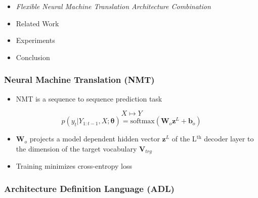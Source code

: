 \begin{frame}

\begin{itemize}
    \item \emph{\color{UOYellow}Flexible Neural Machine Translation Architecture
        Combination}
    \item Related Work
    \item Experiments
    \item Conclusion
\end{itemize}

\end{frame}

\begin{frame}
\frametitle{Neural Machine Translation (NMT)}

\begin{itemize} 
    \item NMT is a sequence to sequence prediction task 
\end{itemize}
\[
    X \mapsto Y
\]
\[
    p(y_t | Y_{1:t-1}, X; \boldsymbol{\theta}) = \text{softmax}(\boldsymbol{W}_o
            \boldsymbol{z}^L + \boldsymbol{b}_o)
\]

\begin{itemize}
    \item $\boldsymbol{W}_o$ projects a model dependent hidden vector
    $\boldsymbol{z}^L$ of the L$^\text{th}$ decoder layer to the dimension of
    the target vocabulary $\boldsymbol{V}_{trg}$
    \item Training minimizes cross-entropy loss
\end{itemize}

\end{frame}

\begin{frame}
\frametitle{Architecture Definition Language (ADL)}
\end{frame}
